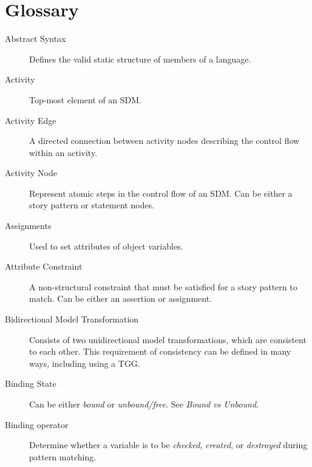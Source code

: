 % 
% 

\newpage
\genHeader
\hypertarget{glossary}{}
\section{Glossary}


\begin{description}

\item[Abstract Syntax] %
Defines the valid static structure of members of a language. 

\item[Activity] %
Top-most element of an SDM.

\item[Activity Edge] %
A directed connection between activity nodes describing the control flow within an activity.

\item[Activity Node] %
Represent atomic steps in the control flow of an SDM. Can be either a story pattern or statement nodes.

\item[Assignments] %
Used to set attributes of object variables.

\item[Attribute Constraint] %
A non-structural constraint that must be satisfied for a story pattern to match. Can be either an assertion or assignment.

\item[Bidirectional Model Transformation] %
Consists of two unidirectional mo\-del transformations, which are consistent to each other. This requirement of
consistency can be defined in many ways, including using a TGG.

\item[Binding State] %
Can be either \emph{bound} or \emph{unbound/free}. See \emph{Bound vs Unbound}.

\item[Binding operator] %
Determine whether a variable is to be \emph{checked}, \emph{created}, or \emph{destroyed} during pattern matching.


\end{description}

